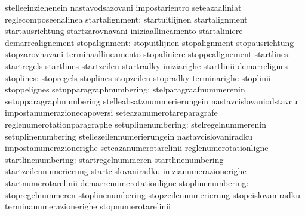                                   stelleeinziehenein               nastavodsazovani
                                  impostarientro                   seteazaaliniat
                                  reglecomposeenalinea
                  startalignment: startuitlijnen                   startalignment
                                  startausrichtung                 startzarovnavani
                                  iniziaallineamento               startaliniere
                                  demarrealignement
                   stopalignment: stopuitlijnen                    stopalignment
                                  stopausrichtung                  stopzarovnavani
                                  terminaallineamento              stopaliniere
                                  stoppealignement
                      startlines: startregels                      startlines
                                  startzeilen                      startradky
                                  iniziarighe                      startlinii
                                  demarrelignes
                       stoplines: stopregels                       stoplines
                                  stopzeilen                       stopradky
                                  terminarighe                     stoplinii
                                  stoppelignes
         setupparagraphnumbering: stelparagraafnummerenin          setupparagraphnumbering
                                  stelleabsatznummerierungein      nastavcislovaniodstavcu
                                  impostanumerazionecapoversi      seteazanumerotareparagrafe
                                  reglenumerotationparagraphe
              setuplinenumbering: stelregelnummerenin              setuplinenumbering
                                  stellezeilennumerierungein       nastavcislovaniradku
                                  impostanumerazionerighe          seteazanumerotarelinii
                                  reglenumerotationligne
              startlinenumbering: startregelnummeren               startlinenumbering
                                  startzeilennumerierung           startcislovaniradku
                                  inizianumerazionerighe           startnumerotarelinii
                                  demarrenumerotationligne
               stoplinenumbering: stopregelnummeren                stoplinenumbering
                                  stopzeilennumerierung            stopcislovaniradku
                                  terminanumerazionerighe          stopnumerotarelinii
